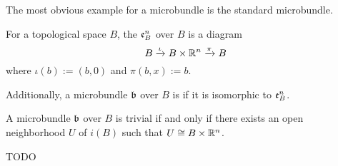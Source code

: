 The most obvious example for a microbundle is the standard microbundle.

\begin{myexample}
    For a topological space $B$, the  $\mathfrak{e}^n_B$ over $B$ is a diagram
    \[ B \xrightarrow{\iota} B \times \mathbb{R}^n \xrightarrow{\pi} B{} \]
    where $\iota(b) := (b, 0)$ and $\pi(b, x) := b$.
    
    Additionally, a microbundle $\mathfrak{b}$ over $B$ is  if it is isomorphic to $\mathfrak{e}^n_B$.
    \begin{mylemma}
        A microbundle $\mathfrak{b}$ over $B$ is trivial if and only if there exists an open neighborhood $U$ of $i(B)$ such that $U \cong B \times \mathbb{R}^n$.
    \end{mylemma}
    \begin{myproof}
        TODO
    \end{myproof}
\end{myexample}